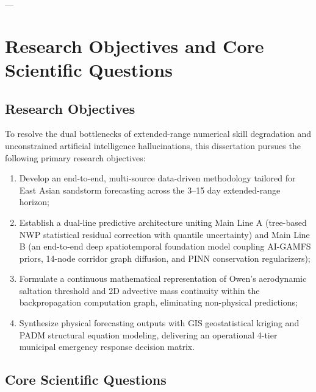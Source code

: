 ---

\section{Research Objectives and Core Scientific Questions}
\label{sec:objectives_questions}

\subsection{Research Objectives}
\label{subsec:objectives}

To resolve the dual bottlenecks of extended-range numerical skill degradation and unconstrained artificial intelligence hallucinations, this dissertation pursues the following primary research objectives:
\begin{enumerate}
    \item Develop an end-to-end, multi-source data-driven methodology tailored for East Asian sandstorm forecasting across the 3--15 day extended-range horizon;
    \item Establish a dual-line predictive architecture uniting Main Line A (tree-based NWP statistical residual correction with quantile uncertainty) and Main Line B (an end-to-end deep spatiotemporal foundation model coupling AI-GAMFS priors, 14-node corridor graph diffusion, and PINN conservation regularizers);
    \item Formulate a continuous mathematical representation of Owen's aerodynamic saltation threshold and 2D advective mass continuity within the backpropagation computation graph, eliminating non-physical predictions;
    \item Synthesize physical forecasting outputs with GIS geostatistical kriging and PADM structural equation modeling, delivering an operational 4-tier municipal emergency response decision matrix.
\end{enumerate}

\subsection{Core Scientific Questions}
\label{subsec:scientific_questions}

